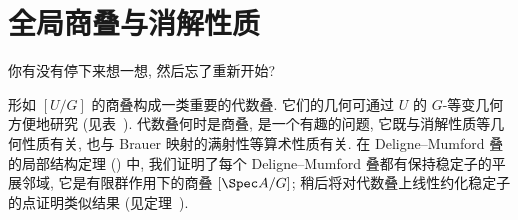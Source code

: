 \section{全局商叠与消解性质}\label{src:7.2}
\begin{epigraph}
你有没有停下来想一想, 然后忘了重新开始?
\end{epigraph}
形如 $[U/G]$ 的商叠构成一类重要的代数叠. 它们的几何可通过 $U$ 的 $G$-等变几何方便地研究 (见表~). 代数叠何时是商叠, 是一个有趣的问题, 它既与消解性质等几何性质有关, 也与 Brauer 映射的满射性等算术性质有关. 在 Deligne--Mumford 叠的局部结构定理 () 中, 我们证明了每个 Deligne--Mumford 叠都有保持稳定子的平展邻域, 它是有限群作用下的商叠 $[\Spec A/G]$; 稍后将对代数叠上线性约化稳定子的点证明类似结果 (见定理~).
